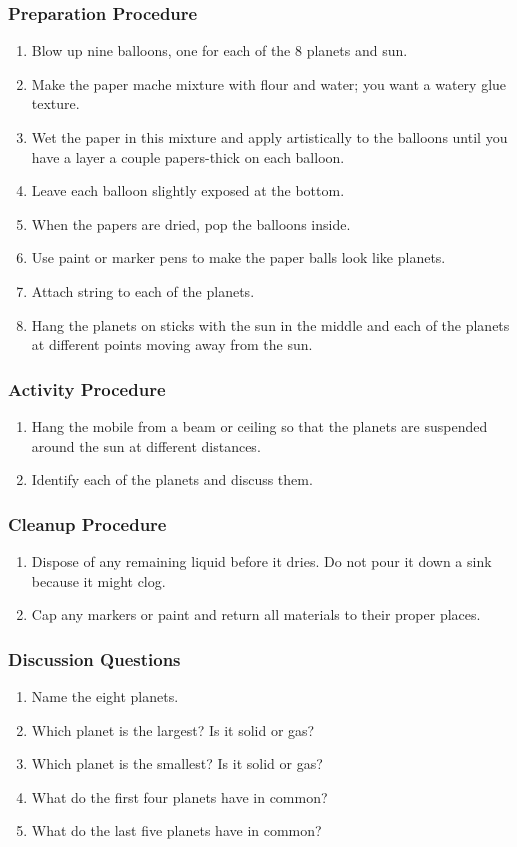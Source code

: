 \subsubsection*{Preparation Procedure}
\begin{enumerate}
\item{Blow up nine balloons, one for each of the 8 planets and sun.}
\item{Make the paper mache mixture with flour and water; you want a watery glue texture.}
\item{Wet the paper in this mixture and apply artistically to the balloons until you have a layer a couple papers-thick on each balloon.}
\item{Leave each balloon slightly exposed at the bottom.}
\item{When the papers are dried, pop the balloons inside.}
\item{Use paint or marker pens to make the paper balls look like planets.}
\item{Attach string to each of the planets.}
\item{Hang the planets on sticks with the sun in the middle and each of the planets at different points moving away from the sun.}
\end{enumerate}

\subsubsection*{Activity Procedure}
\begin{enumerate}
\item{Hang the mobile from a beam or ceiling so that the planets are suspended around the sun at different distances.}
\item{Identify each of the planets and discuss them.}
\end{enumerate}

\subsubsection*{Cleanup Procedure}
\begin{enumerate}
\item{Dispose of any remaining liquid before it dries. Do not pour it down a sink because it might clog.}
\item{Cap any markers or paint and return all materials to their proper places.}
\end{enumerate}

\subsubsection*{Discussion Questions}
\begin{enumerate}
\item{Name the eight planets.}
\item{Which planet is the largest? Is it solid or gas?}
\item{Which planet is the smallest? Is it solid or gas?}
\item{What do the first four planets have in common?}
\item{What do the last five planets have in common?}
\end{enumerate}

